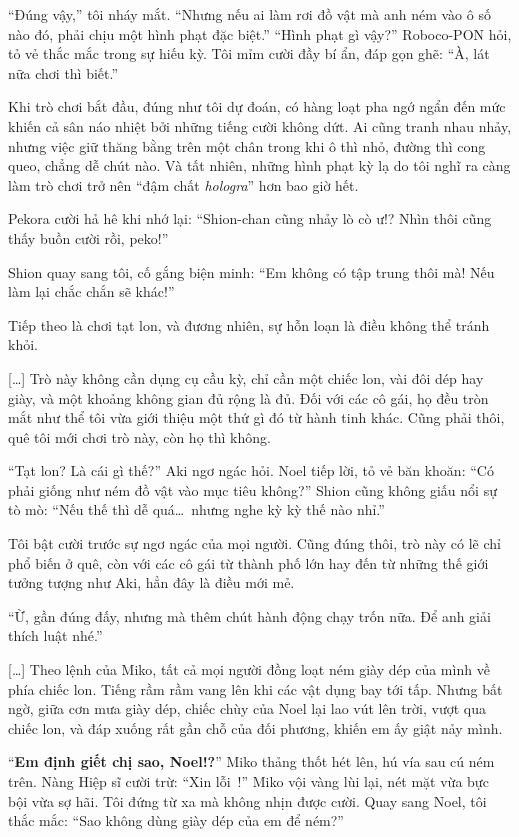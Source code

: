 \documentclass[../main.tex]{subfiles}
\begin{document}
``Đúng vậy,'' tôi nháy mắt. ``Nhưng nếu ai làm rơi đồ vật mà anh ném vào ô số nào đó, phải chịu một hình phạt đặc biệt.'' ``Hình phạt gì vậy?'' Roboco-PON hỏi, tỏ vẻ thắc mắc trong sự hiếu kỳ. Tôi mỉm cười đầy bí ẩn, đáp gọn ghẽ: ``À, lát nữa chơi thì biết.''

Khi trò chơi bắt đầu, đúng như tôi dự đoán, có hàng loạt pha ngớ ngẩn đến mức khiến cả sân náo nhiệt bởi những tiếng cười không dứt. Ai cũng tranh nhau nhảy, nhưng việc giữ thăng bằng trên một chân trong khi ô thì nhỏ, đường thì cong queo, chẳng dễ chút nào. Và tất nhiên, những hình phạt kỳ lạ do tôi nghĩ ra càng làm trò chơi trở nên ``đậm chất \textit{hologra}'' hơn bao giờ hết.

\il

Pekora cười hả hê khi nhớ lại: ``Shion-chan cũng nhảy lò cò ư!? Nhìn thôi cũng thấy buồn cười rồi, peko!''

Shion quay sang tôi, cố gắng biện minh: ``Em không có tập trung thôi mà! Nếu làm lại chắc chắn sẽ khác!''

Tiếp theo là chơi tạt lon, và đương nhiên, sự hỗn loạn là điều không thể tránh khỏi.

\il

[\dots] Trò này không cần dụng cụ cầu kỳ, chỉ cần một chiếc lon, vài đôi dép hay giày, và một khoảng không gian đủ rộng là đủ. Đối với các cô gái, họ đều tròn mắt như thể tôi vừa giới thiệu một thứ gì đó từ hành tinh khác. Cũng phải thôi, quê tôi mới chơi trò này, còn họ thì không.

``Tạt lon? Là cái gì thế?'' Aki ngơ ngác hỏi. Noel tiếp lời, tỏ vẻ băn khoăn: ``Có phải giống như ném đồ vật vào mục tiêu không?'' Shion cũng không giấu nổi sự tò mò: ``Nếu thế thì dễ quá\dots\ nhưng nghe kỳ kỳ thế nào nhỉ.''

Tôi bật cười trước sự ngơ ngác của mọi người. Cũng đúng thôi, trò này có lẽ chỉ phổ biến ở quê, còn với các cô gái từ thành phố lớn hay đến từ những thế giới tưởng tượng như Aki, hẳn đây là điều mới mẻ.

``Ừ, gần đúng đấy, nhưng mà thêm chút hành động chạy trốn nữa. Để anh giải thích luật nhé.''

[\dots] Theo lệnh của Miko, tất cả mọi người đồng loạt ném giày dép của mình về phía chiếc lon. Tiếng rầm rầm vang lên khi các vật dụng bay tới tấp. Nhưng bất ngờ, giữa cơn mưa giày dép, chiếc chùy của Noel lại lao vút lên trời, vượt qua chiếc lon, và đáp xuống rất gần chỗ của đối phương, khiến em ấy giật nảy mình.

``\textbf{Em định giết chị sao, Noel!?}'' Miko thảng thốt hét lên, hú vía sau cú ném trên. Nàng Hiệp sĩ cười trừ: ``Xin lỗi~!'' Miko vội vàng lùi lại, nét mặt vừa bực bội vừa sợ hãi. Tôi đứng từ xa mà không nhịn được cười. Quay sang Noel, tôi thắc mắc: ``Sao không dùng giày dép của em để ném?''
\end{document}
